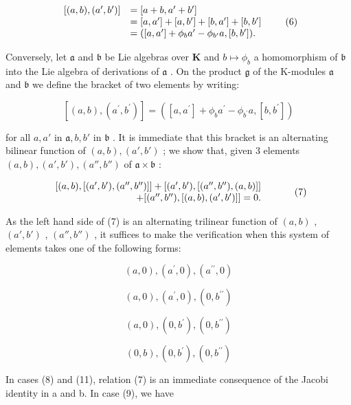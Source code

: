 \[
\begin{array}{r l} {[ (a, b), (a ^ {\prime}, b ^ {\prime}) ]} & {= [ a + b, a ^ {\prime} + b ^ {\prime} ]} \\ & {= [ a, a ^ {\prime} ] + [ a, b ^ {\prime} ] + [ b, a ^ {\prime} ] + [ b, b ^ {\prime} ]} \\ & {= ([ a, a ^ {\prime} ] + \phi_ {b} a ^ {\prime} - \phi_ {b ^ {\prime}} a, [ b, b ^ {\prime} ]).} \end{array}\tag{6}
\]

Conversely, let \(\mathfrak{a}\) and \(\mathfrak{b}\) be Lie algebras over \(\mathbf{K}\) and \(b \mapsto \phi_b\) a homomorphism of \(\mathfrak{b}\) into the Lie algebra of derivations of \(\mathfrak{a}\) . On the product \(\mathfrak{g}\) of the K-modules \(\mathfrak{a}\) and \(\mathfrak{b}\) we define the bracket of two elements by writing:

\[
[ (a, b), (a ^ {\prime}, b ^ {\prime}) ] = ([ a, a ^ {\prime} ] + \phi_ {b} a ^ {\prime} - \phi_ {b ^ {\prime}} a, [ b, b ^ {\prime} ])
\]

for all \(a, a'\) in \(\mathfrak{a}, b, b'\) in \(\mathfrak{b}\) . It is immediate that this bracket is an alternating bilinear function of \((a, b), (a', b')\) ; we show that, given 3 elements \((a, b), (a', b'), (a'', b'')\) of \(\mathfrak{a} \times \mathfrak{b}\) :

\[
\begin{array}{r l} {[ (a, b), [ (a ^ {\prime}, b ^ {\prime}), (a ^ {\prime \prime}, b ^ {\prime \prime}) ] ] + [ (a ^ {\prime}, b ^ {\prime}), [ (a ^ {\prime \prime}, b ^ {\prime \prime}), (a, b) ] ]} & \\ {+ [ (a ^ {\prime \prime}, b ^ {\prime \prime}), [ (a, b), (a ^ {\prime}, b ^ {\prime}) ] ] = 0.} \end{array}\tag{7}
\]

As the left hand side of (7) is an alternating trilinear function of \((a, b)\) , \((a', b')\) , \((a'', b'')\) , it suffices to make the verification when this system of elements takes one of the following forms:

\[
(a, 0), (a ^ {\prime}, 0), (a ^ {\prime \prime}, 0)\tag{8}
\]

\[
(a, 0), (a ^ {\prime}, 0), (0, b ^ {\prime \prime})\tag{9}
\]

\[
(a, 0), (0, b ^ {\prime}), (0, b ^ {\prime \prime})\tag{10}
\]

\[
(0, b), (0, b ^ {\prime}), (0, b ^ {\prime \prime})\tag{11}
\]

In cases (8) and (11), relation (7) is an immediate consequence of the Jacobi identity in a and b. In case (9), we have

